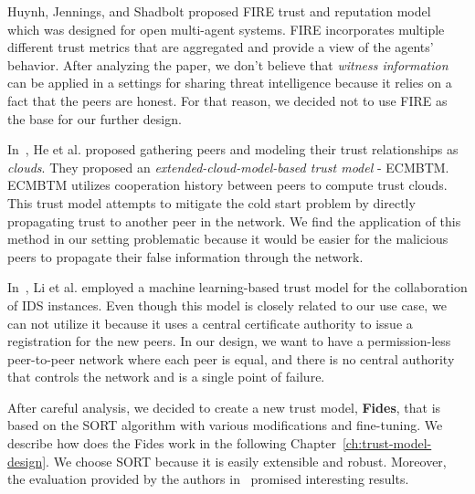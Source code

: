 Huynh, Jennings, and Shadbolt proposed FIRE trust and reputation model~\cite{huynh2006integrated} which was designed for open multi-agent systems.
FIRE incorporates multiple different trust metrics that are aggregated and provide a view of the agents' behavior.
After analyzing the paper, we don't believe that \textit{witness information}~\cite{huynh2006integrated} can be applied in a settings for sharing threat intelligence because it relies on a fact that the peers are honest.
For that reason, we decided not to use FIRE as the base for our further design.

In~\cite{1562680}, He et al. proposed gathering peers and modeling their trust relationships as \textit{clouds}. They proposed an \textit{extended-cloud-model-based trust model} - ECMBTM.
ECMBTM utilizes cooperation history between peers to compute trust clouds. 
This trust model attempts to mitigate the cold start problem by directly propagating trust to another peer in the network.
We find the application of this method in our setting problematic because it would be easier for the malicious peers to propagate their false information through the network.

In~\cite{li2014design}, Li et al. employed a machine learning-based trust model for the collaboration of IDS instances.
Even though this model is closely related to our use case, we can not utilize it because it uses a central certificate authority to issue a registration for the new peers. 
In our design, we want to have a permission-less peer-to-peer network where each peer is equal, and there is no central authority that controls the network and is a single point of failure.

\vspace{1cm}

\noindent
After careful analysis, we decided to create a new trust model, \textbf{Fides}, that is based on the SORT algorithm with various modifications and fine-tuning.
We describe how does the Fides work in the following Chapter~\ref{ch:trust-model-design}.
We choose SORT because it is easily extensible and robust. 
Moreover, the evaluation provided by the authors in~\cite{sort} promised interesting results.
